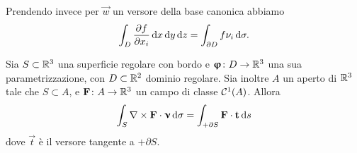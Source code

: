 Prendendo invece per $\vec w$ un versore della base canonica abbiamo
\begin{equation}
	\int_D\frac{\partial {f}}{\partial {x_i}}\,\textup{d} x\,\textup{d} y\,\textup{d} z=\int_{\partial D}f\nu_i\,\textup{d}\sigma.
\end{equation}
\begin{teorema} \label{t:rotore-R3}
	Sia $S\subset\mathbb{R}^3$ una superficie regolare con bordo e $\bm{\upvarphi}\colon D\to\mathbb{R}^3$ una sua parametrizzazione, con $D\subset\mathbb{R}^2$ dominio regolare.
	Sia inoltre $A$ un aperto di $\mathbb{R}^3$ tale che $S\subset A$, e $\mathbf{F}\colon A\to\mathbb{R}^3$ un campo di classe $\mathcal{C}^{{1}}(A)$.
	Allora
	\begin{equation}
		\int_S{\nabla\times\mathbf{F}}\cdot{\bm{\upnu}}\,\textup{d}\sigma=\int_{+\partial S}{\mathbf{F}}\cdot{\mathbf{t}}\,\textup{d} s
		\label{eq:rotore-R3}
	\end{equation}
	dove $\vec t$ è il versore tangente a $+\partial S$.
\end{teorema}
